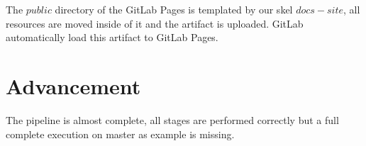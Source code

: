 \documentclass[a4paper,10pt]{scrartcl}
\begin{document}
The $public$ directory of the GitLab Pages is templated by our skel $docs-site$, all resources are moved inside of it and the artifact is uploaded. GitLab automatically load this artifact to GitLab Pages.

\section{Advancement}

The pipeline is almost complete, all stages are performed correctly but a full complete execution on master as example is missing.
\end{document}
